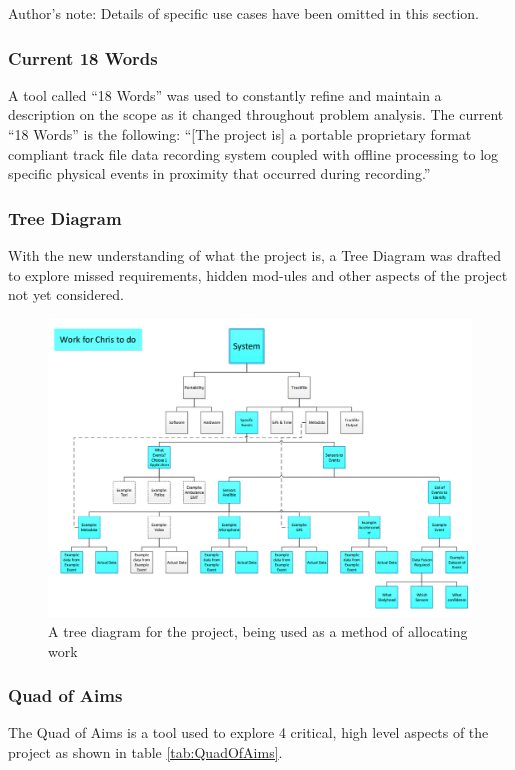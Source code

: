 \documentclass{UoNMCHA}
\numberwithin{equation}{section}
\begin{document}
Author’s note: Details of specific use cases have been omitted in this section. 

\subsubsection{Current 18 Words}
A tool called “18 Words” was used to constantly refine and maintain a description on the scope as it changed throughout problem analysis. The current “18 Words” is the following:
“[The project is] a portable proprietary format compliant track file data recording system coupled with offline processing to log specific physical events in proximity that occurred during recording.” 

\subsubsection{Tree Diagram}
With the new understanding of what the project is, a Tree Diagram was drafted to explore missed requirements, hidden mod-ules and other aspects of the project not yet considered. 
\begin{figure}[ht]
    \begin{center}
        \includegraphics[width=0.8\linewidth]{Figures/treeDiagram.png}
        \caption{A tree diagram for the project, being used as a method of allocating work}
        \label{fig:AndroidDataExample}
    \end{center}
 \end{figure}

\subsubsection{Quad of Aims}
The Quad of Aims is a tool used to explore 4 critical, high level aspects of the project as shown in table \ref{tab:QuadOfAims}.
\end{document}

